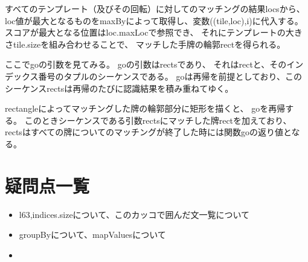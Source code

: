 \documentclass{jsarticle}
\begin{document}
\begin{multicols}{2}
\begin{comment}
val ((tile, loc), i) = locs.zipWithIndex.maxBy(_._1._2.mavVal)
について、
どうしてひとつのテンプレートの値だけに着目しているのか
他のテンプレートの値はどうなっている？
ループで呼ぶのか？
だとしたらval locs= { ... }
の処理が毎回呼ばれる分処理に問題がないか？
\end{comment}
\begin{comment}
goのループで読んでいる。
処理は大変重たい。
しかしminMaxLocの関数の仕様上、
matchTemplate -> minMaxLocという
openCVのマッチングの流れ上、
仕方のない話なのである。
\end{comment}

すべてのテンプレート（及びその回転）に対してのマッチングの結果locsから、
loc値が最大となるものをmaxByによって取得し、変数((tile,loc),i)に代入する。
スコアが最大となる位置はloc.maxLocで参照でき、
それにテンプレートの大きさtile.sizeを組み合わせることで、
マッチした手牌の輪郭rectを得られる。

ここでgoの引数を見てみる。
goの引数はrectsであり、
それはrectと、そのインデックス番号のタプルのシーケンスである。
goは再帰を前提としており、このシーケンスrectsは再帰のたびに認識結果を積み重ねてゆく。

\begin{comment}
・43行目case(hand,contour) if hand.size.area>0の意味
・pair => !intersects ...　の処理がわからない
・rectangle？矩形を描く？Imgproc.rectangleが見つからない...
\end{comment}

rectangleによってマッチングした牌の輪郭部分に矩形を描くと、
goを再帰する。
このときシーケンスである引数rectsにマッチした牌rectを加えており、
rectsはすべての牌についてのマッチングが終了した時には関数goの返り値となる。

\begin{comment}
・sortby(_._2.x)のxは何を指しているのか？
・map(_._1)は何を実行しているのか？
\end{comment}

\section{疑問点一覧}
\begin{itemize}
\item l63,indices.sizeについて、このカッコで囲んだ文一覧について
\item groupByについて、mapValuesについて
\item 
\end{itemize}


\end{multicols}
\end{document}
